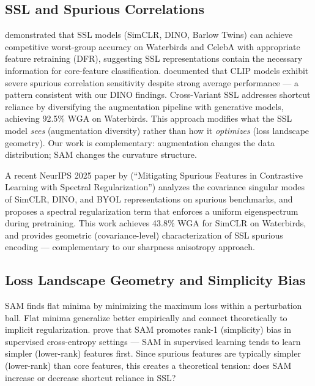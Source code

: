 \subsection{SSL and Spurious Correlations}

\citet{izmailov2022ssl} demonstrated that SSL models (SimCLR, DINO, Barlow Twins) can achieve competitive worst-group accuracy on Waterbirds and CelebA with appropriate feature retraining (DFR), suggesting SSL representations contain the necessary information for core-feature classification. \citet{zhang2022contrastive} documented that CLIP models exhibit severe spurious correlation sensitivity despite strong average performance --- a pattern consistent with our DINO findings. Cross-Variant SSL \citep{yadav2026crossvariant} addresses shortcut reliance by diversifying the augmentation pipeline with generative models, achieving 92.5\% WGA on Waterbirds. This approach modifies what the SSL model \textit{sees} (augmentation diversity) rather than how it \textit{optimizes} (loss landscape geometry). Our work is complementary: augmentation changes the data distribution; SAM changes the curvature structure.

A recent NeurIPS 2025 paper by \citet{chen2025spectral} (``Mitigating Spurious Features in Contrastive Learning with Spectral Regularization'') analyzes the covariance singular modes of SimCLR, DINO, and BYOL representations on spurious benchmarks, and proposes a spectral regularization term that enforces a uniform eigenspectrum during pretraining. This work achieves 43.8\% WGA for SimCLR on Waterbirds, and provides geometric (covariance-level) characterization of SSL spurious encoding --- complementary to our sharpness anisotropy approach.

\subsection{Loss Landscape Geometry and Simplicity Bias}

SAM \citep{foret2021sam} finds flat minima by minimizing the maximum loss within a perturbation ball. Flat minima generalize better empirically and connect theoretically to implicit regularization. \citet{gatmiry2024sam} prove that SAM promotes rank-1 (simplicity) bias in supervised cross-entropy settings --- SAM in supervised learning tends to learn simpler (lower-rank) features first. Since spurious features are typically simpler (lower-rank) than core features, this creates a theoretical tension: does SAM increase or decrease shortcut reliance in SSL?

